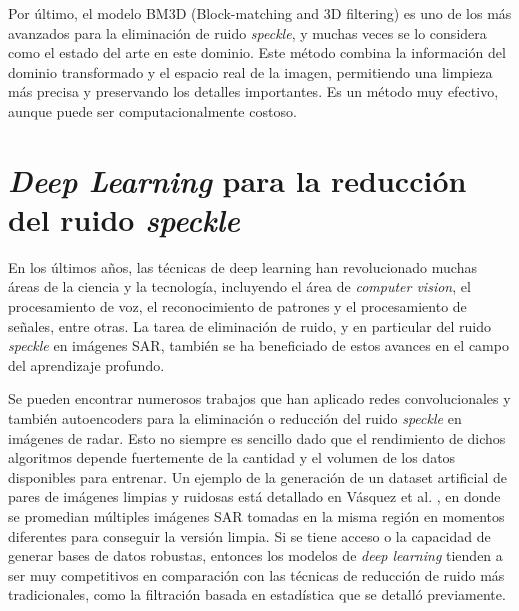 Por último, el modelo BM3D (Block-matching and 3D filtering) \cite{parrilli2012nonlocal} es uno de los más avanzados para la eliminación de ruido \emph{speckle}, y muchas veces se lo considera como el estado del arte en este dominio. Este método combina la información del dominio transformado y el espacio real de la imagen, permitiendo una limpieza más precisa y preservando los detalles importantes. Es un método muy efectivo, aunque puede ser computacionalmente costoso.

\section{\emph{Deep Learning} para la reducción del ruido \emph{speckle}}

En los últimos años, las técnicas de deep learning han revolucionado muchas áreas de la ciencia y la tecnología, incluyendo el área de \emph{computer vision}, el procesamiento de voz, el reconocimiento de patrones y el procesamiento de señales, entre otras. La tarea de eliminación de ruido, y en particular del ruido \emph{speckle} en imágenes SAR, también se ha beneficiado de estos avances en el campo del aprendizaje profundo.

Se pueden encontrar numerosos trabajos que han aplicado redes convolucionales y también autoencoders para la eliminación o reducción del ruido \emph{speckle} en imágenes de radar. Esto no siempre es sencillo dado que el rendimiento de dichos algoritmos depende fuertemente de la cantidad y el volumen de los datos disponibles para entrenar. Un ejemplo de la generación de un dataset artificial de pares de imágenes limpias y ruidosas está detallado en Vásquez et al. \cite{vasquez2024labeled}, en donde se promedian múltiples imágenes SAR tomadas en la misma región en momentos diferentes para conseguir la versión limpia. Si se tiene acceso o la capacidad de generar bases de datos robustas, entonces los modelos de \emph{deep learning} tienden a ser muy competitivos en comparación con las técnicas de reducción de ruido más tradicionales, como la filtración basada en estadística que se detalló previamente.

